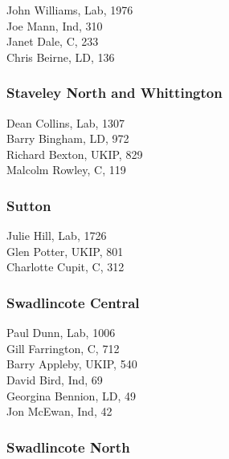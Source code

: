 \documentclass[a4paper,openany,10pt]{book}
\begin{document}


John Williams, Lab, 1976\\
Joe Mann, Ind, 310\\
Janet Dale, C, 233\\
Chris Beirne, LD, 136\\


\subsubsection*{Staveley North and Whittington}



Dean Collins, Lab, 1307\\
Barry Bingham, LD, 972\\
Richard Bexton, UKIP, 829\\
Malcolm Rowley, C, 119\\


\subsubsection*{Sutton}



Julie Hill, Lab, 1726\\
Glen Potter, UKIP, 801\\
Charlotte Cupit, C, 312\\


\subsubsection*{Swadlincote Central}



Paul Dunn, Lab, 1006\\
Gill Farrington, C, 712\\
Barry Appleby, UKIP, 540\\
David Bird, Ind, 69\\
Georgina Bennion, LD, 49\\
Jon McEwan, Ind, 42\\


\subsubsection*{Swadlincote North}
\end{document}
